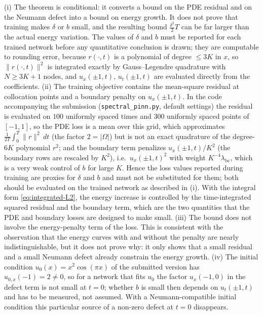 \begin{Remark}\label{rem:compute}
(i) The theorem is conditional: it converts a bound on the PDE residual and on the Neumann defect into a bound on energy growth. It does not prove that training makes $\delta$ or $b$ small, and the resulting bound $\frac{\delta^2}{2}T$ can be far larger than the actual energy variation.
The values of $\delta$ and $b$ must be reported for each trained network before any quantitative conclusion is drawn; they are computable to rounding error, because $r(\cdot,t)$ is a polynomial of degree $\le3K$ in $x$, so $\|r(\cdot,t)\|^2$ is integrated exactly by Gauss--Legendre quadrature with $N\ge3K+1$ nodes, and $u_x(\pm1,t)$, $u_t(\pm1,t)$ are evaluated directly from the coefficients.
(ii) The training objective contains the mean-square residual at collocation points and a boundary penalty on $u_x(\pm1,t)$.
In the code accompanying the submission (\texttt{spectral\_pinn.py}, default settings) the residual is evaluated on $100$ uniformly spaced times and $300$ uniformly spaced points of $[-1,1]$, so the PDE loss is a mean over this grid, which approximates $\frac{1}{2T}\int_0^T\|r\|^2\,dt$ (the factor $2=|\Omega|$) but is not an exact quadrature of the degree-$6K$ polynomial $r^2$; and the boundary term penalizes $u_x(\pm1,t)/K^2$ (the boundary rows are rescaled by $K^2$), i.e.\ $u_x(\pm1,t)^2$ with weight $K^{-4}\lambda_{\mathrm{bc}}$, which is a very weak control of $b$ for large $K$.
Hence the loss values reported during training are proxies for $\delta$ and $b$ and must not be substituted for them; both should be evaluated on the trained network as described in (i).
With the integral form \eqref{eq:integrated-L2}, the energy increase is controlled by the time-integrated squared residual and the boundary term, which are the two quantities that the PDE and boundary losses are designed to make small.
(iii) The bound does not involve the energy-penalty term of the loss.
This is consistent with the observation that the energy curves with and without the penalty are nearly indistinguishable, but it does not prove why: it only shows that a small residual and a small Neumann defect already constrain the energy growth.
(iv) The initial condition $u_0(x)=x^2\cos(\pi x)$ of the submitted version has $u_{0,x}(-1)=2\neq0$, so for a network that fits $u_0$ the factor $u_x(-1,0)$ in the defect term is not small at $t=0$; whether $b$ is small then depends on $u_t(\pm1,t)$ and has to be measured, not assumed. With a Neumann-compatible initial condition this particular source of a non-zero defect at $t=0$ disappears.
\end{Remark}

